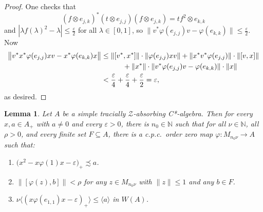 \documentclass[11pt]{amsart}
\theoremstyle{plain}
\newtheorem{lemma}[theorem]{Lemma}
\theoremstyle{definition}
\theoremstyle{remark}
\numberwithin{equation}{section}
\newcommand{\N}{\mathbb{N}}
\newcommand{\ep}{\varepsilon}
\newcommand{\ld}{\lambda}
\newcommand{\ph}{\varphi}
\newcommand{\rh}{\rho}
\begin{document}
\begin{proof}
One checks that
\[
(f \otimes e_{j, k})^* (t \otimes e_{j, j}) (f \otimes e_{j, k})
 = t f^2 \otimes e_{k, k}
\]
and
$| \ld f (\ld)^2 - \ld | \leq \frac{\ep}{2}$
for all $\ld \in [0, 1]$,
so
$\| v^* \ph (e_{j, j}) v - \ph (e_{k, k}) \| \leq \frac{\ep}{2}$.
Now
%
\begin{align*}
\bigl\| v^* x^* \ph (e_{j, j}) x v - x^* \ph (e_{k, k}) x \bigr\|
& \leq \| [ v^*, x^* ] \| \cdot \| \ph (e_{j, j}) x v \|
        + \| x^*v^* \ph (e_{j, j}) \|\cdot \| [v, x] \|
\\
& \hspace*{3em} {\mbox{}}
        + \| x^* \|\cdot \| v^* \ph (e_{j, j}) v - \ph (e_{k, k}) \|\cdot \| x \|
\\
& < \frac{\ep}{4} + \frac{\ep}{4} + \frac{\ep}{2}
  = \ep,
\end{align*}
%
as desired.
\end{proof}


\begin{lemma}\label{L_8808_EltsSmall}
Let $A$ be a simple tracially $\mathcal{Z}$-absorbing C*-algebra.
Then
for every $x, a \in A_{+}$ with $a \neq 0$
and every $\varepsilon > 0$,
there is $n_0 \in \N$
such that for all $\nu \in \mathbb{N}$, all $\rh > 0$,
and every finite set $F \subseteq A$,
there is a c.p.c.~order zero map $\varphi \colon M_{n_0 \nu} \to A$
such that:
%
\begin{enumerate}
%
\item\label{deftza-it1_Small}
$\bigl( x^{2} - x \varphi (1) x - \varepsilon \bigr)_{+} \precsim a$.
%
\item\label{deftza-it2_Small}
$\| [\varphi (z), b] \| < \rh$
for any $z \in M_{n_0 \nu}$ with $\| z \| \leq 1$ and any $b \in F$.
%
\item\label{deftza-it3_Small}
$\nu \bigl\langle ( x \ph (e_{1, 1}) x - \varepsilon )_{+} \bigr\rangle
 \leq \langle a \rangle$
in $W (A)$.
\end{enumerate}
%
\end{lemma}
\end{document}
